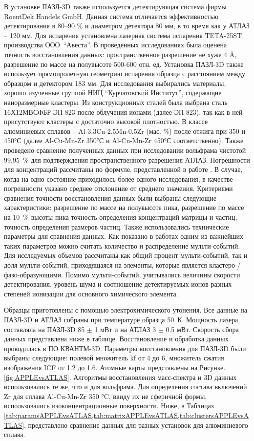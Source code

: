 В установке ПАЗЛ-3D \cite{scbibAPPLE} также используется детектирующая система фирмы RoentDek Handels
GmbH. Данная система отличается эффективностью детектирования в 80–90 $\%$ и диаметром детектора 80 мм, в то время как у АТЛАЗ – 120 мм. Для испарения установлена лазерная система испарения TETA-25ST производства ООО~“Авеста”. В проведенных исследованиях \cite{scbibAPPLE,Shutov18} была оценена точность восстановления данных: пространственное разрешение не хуже 4 \r{A}, разрешение по массе на полувысоте 500-600 отн. ед. Установка ПАЗЛ-3D также использует прямопролетную геометрию испарения образца с расстоянием между образцом и детектором 183 мм. 
Для исследования выбирались материалы, хорошо изученные группой НИЦ “Курчатовский Институт”, содержащие наноразмерные кластеры. Из конструкционных сталей была выбрана сталь 16Х12МВСФБР ЭП-823 \cite{Porollo04} после облучения ионами (далее ЭП-823), так как в ней присутствуют кластеры с достаточно высокой плотностью. В классе алюминиевых сплавов – Al-3.3Cu-2.5Mn-0.5Zr (мас. \%) после отжига при 350 и 450°С \cite{Belov22,Belov21} (далее Al-Cu-Mn-Zr 350°С и Al-Cu-Mn-Zr 450°С соответственно). Также проведено сравнение полученных данных при исследовании вольфрама чистотой 99.95~\% для подтверждения пространственного разрешения АТЛАЗ. Погрешности для концентраций рассчитаны по формуле, представленной в работе \cite{Danoix071,Danoix072}. В случае, когда на одно состояние приходилось более одного исследования, в качестве погрешности указано среднее отклонение от среднего значения.
Критериями сравнения точности восстановления данных были выбраны следующие характеристики: разрешение по массе на полувысоте пика, разрешение по массе на 10~\% высоты пика точность определения концентраций матрицы и частиц, точность определения размеров частиц. Также использовались технические параметры для сравнения данных. Как показано в работах \cite{Tang10,Geuser07} одним из важнейших таких параметров можно считать количество и распределение мульти-событий. Для исследуемых объемов рассчитаны как общий процент мульти-событий, так и доля мульти-событий, приходящаяся на элементы, которые является кластеро-/фазо-образующими. Помимо мульти-событий, учитывались величины скорости детектирования, уровень шума и соотношение детектируемых ионов разных степеней ионизации для основного химического элемента.

Образцы приготовлены с помощью электрохимического утонения. Все данные на ПАЗЛ-3D и АТЛАЗ собраны при температуре образца 50~К. Мощность лазера составляла на ПАЗЛ-3D 85 $\pm$ 1 мВт и на АТЛАЗ 3 $\pm$ 0.5 мВт. Скорость сбора данных представлена ниже в таблице. Восстановление и обработка данных проводилась в ПО КВАНТМ-3D. Параметры восстановления для ПАЗЛ-3D были выбраны следующие: полевой множитель kf от 4 до 6, множитель сжатия изображения ICF от 1.2 до 1.6. Атомные карты представлены на Рисунке.  \cref{fig:APPLEvsATLAS}. Алгоритмы восстановления масс-спектра и 3D данных использовались те же, что и для вольфрама. Для определения состава включений Zr для сплава Al-Cu-Mn-Zr 350 °C, ввиду их не сферичной формы, использовались изоконцентрационные поверхности. Ниже, в Таблицах \cref{tab:paramsAPPLEvsATLAS,tab:matrixAPPLEvsATLAS,tab:clustersAPPLEvsATLAS}, представлено сравнение данных для разных установок для алюминиевого сплава.

